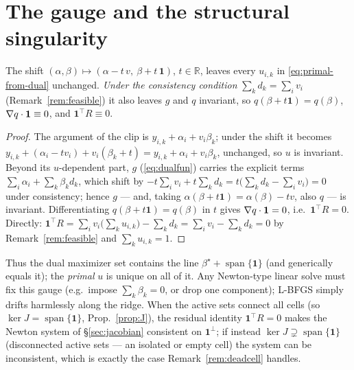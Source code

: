 \documentclass[11pt,a4paper]{article}
\begin{document}
\section{The gauge and the structural singularity}
\label{sec:gauge}
\begin{prop}
\label{prop:gauge}
The shift $(\alpha,\beta)\mapsto(\alpha-t\,v,\ \beta+t\,\mathbf 1)$, $t\in\mathbb{R}$, leaves
every $u_{i,k}$ in \eqref{eq:primal-from-dual} unchanged. \emph{Under the consistency condition}
$\sum_k d_k=\sum_i v_i$ (Remark~\ref{rem:feasible}) it also leaves $g$ and $q$ invariant, so
$q(\beta+t\mathbf 1)=q(\beta)$, $\nabla q\cdot\mathbf 1\equiv0$, and $\mathbf 1^\top R\equiv0$.
\end{prop}
\begin{proof}
The argument of the clip is $y_{i,k}+\alpha_i+v_i\beta_k$; under the shift it becomes
$y_{i,k}+(\alpha_i-tv_i)+v_i(\beta_k+t)=y_{i,k}+\alpha_i+v_i\beta_k$, unchanged, so $u$ is
invariant. Beyond its $u$-dependent part, $g$ (\eqref{eq:dualfun}) carries the explicit terms
$\sum_i\alpha_i+\sum_k\beta_k d_k$, which shift by $-t\sum_i v_i+t\sum_k d_k
=t\bigl(\sum_k d_k-\sum_i v_i\bigr)=0$ under consistency; hence $g$ --- and, taking
$\alpha(\beta+t\mathbf 1)=\alpha(\beta)-tv$, also $q$ --- is invariant. Differentiating
$q(\beta+t\mathbf 1)=q(\beta)$ in $t$ gives $\nabla q\cdot\mathbf 1=0$, i.e.\ $\mathbf 1^\top R=0$.
Directly: $\mathbf 1^\top R=\sum_i v_i\bigl(\sum_k u_{i,k}\bigr)-\sum_k d_k=\sum_i v_i-\sum_k d_k=0$
by Remark~\ref{rem:feasible} and $\sum_k u_{i,k}=1$.
\end{proof}

Thus the dual maximizer set contains the line $\beta^\star+\operatorname{span}\{\mathbf 1\}$
(and generically equals it); the \emph{primal} $u$ is unique on all of it. Any Newton-type
linear solve must fix this gauge (e.g.\ impose $\sum_k\beta_k=0$, or drop one component);
L-BFGS simply drifts harmlessly along the ridge. When the active sets connect all cells (so
$\ker J=\operatorname{span}\{\mathbf 1\}$, Prop.~\ref{prop:J}), the residual identity
$\mathbf 1^\top R=0$ makes the Newton system of \S\ref{sec:jacobian} consistent on
$\mathbf 1^\perp$; if instead $\ker J\supsetneq\operatorname{span}\{\mathbf 1\}$ (disconnected
active sets --- an isolated or empty cell) the system can be inconsistent, which is exactly
the case Remark~\ref{rem:deadcell} handles.

\end{document}

